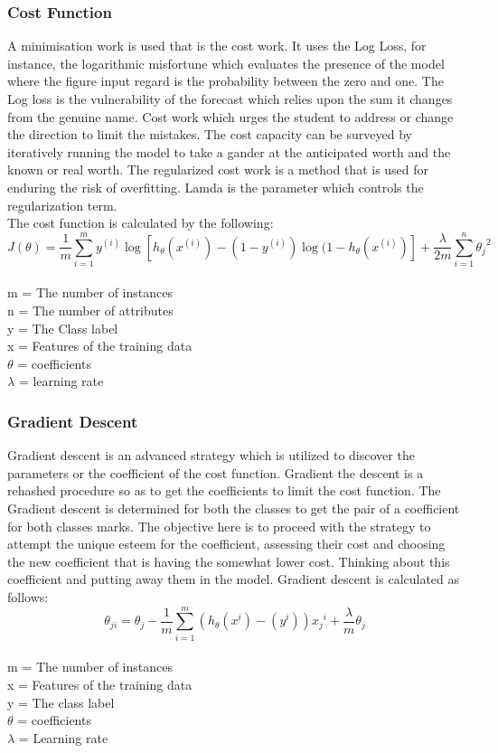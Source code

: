 \documentclass[oneside,12pt]{Classes/VTU}
\begin{document}
    	\subsubsection{Cost Function}
    		A minimisation work is used that is the cost work. It uses the Log Loss, for instance, the logarithmic misfortune which evaluates the presence of the model where the figure input regard is the probability between the zero and one. The Log loss is the vulnerability of the forecast which relies upon the sum it changes from the genuine name. Cost work which urges the student to address or change the direction to limit the mistakes. The cost capacity can be surveyed by iteratively running the model to take a gander at the anticipated worth and the known or real worth. The regularized cost work is a method that is used for enduring the risk of overfitting. Lamda is the parameter which controls the regularization term.\\
    		The cost function is calculated by the following:
    		\[ J(\theta) = \frac{1}{m}\sum_{i=1}^{m} y^{(i)} \log[h_\theta(x^{(i)}) - (1-y^{(i)}) \log(1-h_\theta(x^{(i)})] + \frac{\lambda}{2m}\sum_{i=1}^{n}{\theta_j}^2 \] \\
    		m = The number of instances \\
    		n = The number of attributes \\
    		y = The Class label \\
    		x = Features of the training data\\
    		$\theta$ = coefficients \\ 
    		$\lambda$ = learning rate
    	
    	
    	\subsubsection{Gradient Descent}
    		Gradient descent is an advanced strategy which is utilized to discover the parameters or the coefficient of the cost function. Gradient the descent is a rehashed procedure so as to get the coefficients to limit the cost function. The Gradient descent is determined for both the classes to get the pair of a coefficient for both classes marks. The objective here is to proceed with the strategy to attempt the unique esteem for the coefficient, assessing their cost and choosing the new coefficient that is having the somewhat lower cost. Thinking about this coefficient and putting away them in the model. Gradient descent is calculated as follows:
    		\[ \theta_{ji} = \theta_j - \frac{1}{m}\sum_{i=1}^{m}(h_\theta(x^i)-(y^i)) {x_j}^i + \frac{\lambda}{m} \theta_j \]\\
    		m = The number of instances \\
    		x = Features of the training data \\
    		y = The class label \\
    		$\theta$ = coefficients \\
    		$\lambda$ = Learning rate 
    		
\end{document}
